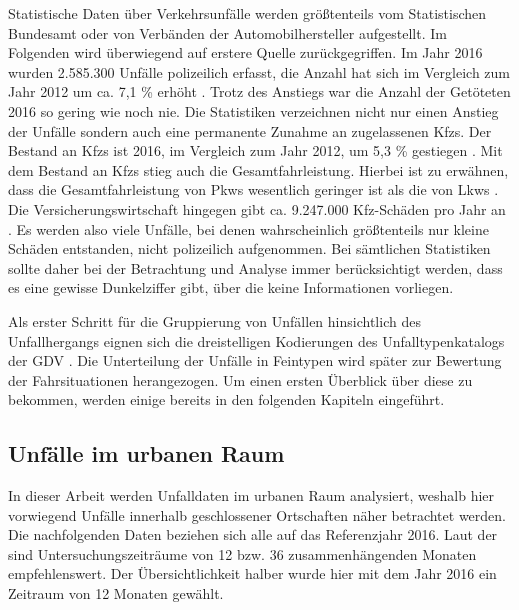 Statistische Daten über Verkehrsunfälle werden größtenteils vom Statistischen Bundesamt oder von Verbänden der Automobilhersteller aufgestellt. Im Folgenden wird überwiegend auf erstere Quelle zurückgegriffen. Im Jahr 2016 wurden 2.585.300 Unfälle polizeilich erfasst, die Anzahl hat sich im Vergleich zum Jahr 2012 um ca. 7,1 \% erhöht \parencite[S. 5]{StatistischesBundesamt.2018}. Trotz des Anstiegs war die Anzahl der Getöteten 2016 so gering wie noch nie. Die Statistiken verzeichnen nicht nur einen Anstieg der Unfälle sondern auch eine permanente Zunahme an zugelassenen \acp{Kfz}. Der Bestand an \acp{Kfz} ist 2016, im Vergleich zum Jahr 2012, um 5,3 \% gestiegen \parencite[S. 5]{StatistischesBundesamt.2018}. Mit dem Bestand an \aclp{Kfz} stieg auch die Gesamtfahrleistung. Hierbei ist zu erwähnen, dass die Gesamtfahrleistung von Pkws wesentlich geringer ist als die von Lkws \parencite[S. 150]{BundesministeriumfurVerkehrunddigitaleInfrastruktur.2017}. Die Versicherungswirtschaft hingegen gibt ca. 9.247.000 \acs{Kfz}-Schäden pro Jahr an \parencite[S. 27]{Burg.2017}. Es werden also viele Unfälle, bei denen wahrscheinlich größtenteils nur kleine Schäden entstanden, nicht polizeilich aufgenommen. Bei sämtlichen Statistiken sollte daher bei der Betrachtung und Analyse immer berücksichtigt werden, dass es eine gewisse Dunkelziffer gibt, über die keine Informationen vorliegen.

Als erster Schritt für die Gruppierung von Unfällen hinsichtlich des Unfallhergangs eignen sich die dreistelligen Kodierungen des Unfalltypenkatalogs der \ac{GDV} \parencite[S. 18]{Vollrath.2006}. Die Unterteilung der Unfälle in Feintypen wird später zur Bewertung der Fahrsituationen herangezogen. Um einen ersten Überblick über diese zu bekommen, werden einige bereits in den folgenden Kapiteln eingeführt.

\subsection{Unfälle im urbanen Raum}
In dieser Arbeit werden Unfalldaten im urbanen Raum analysiert, weshalb hier vorwiegend Unfälle innerhalb geschlossener Ortschaften näher betrachtet werden. Die nachfolgenden Daten beziehen sich alle auf das Referenzjahr 2016. Laut der \Textcite[S. 11]{ForschungsgesellschaftfurStraenundVerkehrswesen.2012} sind Untersuchungszeiträume von 12 bzw. 36 zusammenhängenden Monaten empfehlenswert. Der Übersichtlichkeit halber wurde hier mit dem Jahr 2016 ein Zeitraum von 12 Monaten gewählt.


